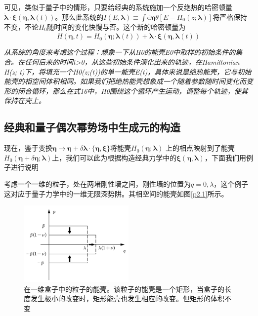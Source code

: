 可见，类似于量子中的情形，只要给经典的系统施加一个反绝热的哈密顿量$\dot{\boldsymbol{\lambda}} \cdot \boldsymbol{\xi}(\bm{\eta}, \boldsymbol{\lambda}(t))$。那么此系统的$I(E, \boldsymbol{\lambda}) \equiv \int \mathrm{d} \bm{\eta} \theta\left[E-H_{0}(z ; \boldsymbol{\lambda})\right]$将严格保持不变，不论$H_0 $随时间的变化快慢与否。这个新的哈密顿量为
\begin{equation}
    H(\bm{\eta}, t)=H_{0}(\bm{\eta} ; \boldsymbol{\lambda}(t))+\dot{\boldsymbol{\lambda}} \cdot \boldsymbol{\xi}(\bm{\eta}, \boldsymbol{\lambda}(t))
    \label{eq2.17}
\end{equation}

\emph{从系综的角度来考虑这个过程：想象一下从H0的能壳E0中取样的初始条件的集合。在任何后来的时间t>0，从这些初始条件演化出来的轨迹，在Hamiltonian H(z; t)下，将填充一个H0(z;(t))的单一能壳E(t)，具体来说是绝热能壳，它与初始能壳的相空间体积相同。如果我们把绝热能壳想象成一个随着参数随时间变化而变形的闭合循环，那么在式16中，H0围绕这个循环产生运动，调整每个轨迹，使其保持在壳上。}

\subsection{经典和量子偶次幂势场中生成元的构造}

\qquad 现在，鉴于变换$\bm{\eta} \to \bm{\eta} + \delta  \bm{\lambda} \cdot \{\bm{\eta}, \boldsymbol{\xi}\}$将能壳$H_{0}(\bm{\eta} ; \boldsymbol{\lambda})$ 上的相点映射到了能壳 $ H_{0}(\bm{\eta} + \delta \bm{\eta} ; \boldsymbol{\lambda})$上，我们可以此为根据构造经典力学中的$\boldsymbol{\xi}(\bm{\eta}, \boldsymbol{\lambda})$，下面我们用例子进行说明

考虑一个一维的粒子，处在两堵刚性墙之间，刚性墙的位置为$q=0,\lambda$，这个例子这对应于量子力学中的一维无限深势阱。其相空间的能壳如图\eqref{p2.1}所示。
\begin{figure}[!htbp]
    \begin{center}
        \includegraphics[width=0.5\textwidth]{figures/p2.1.pdf}
    \end{center}
    \caption{在一维盒子中的粒子的能壳。该粒子的能壳是一个矩形，当盒子的长度发生极小的改变时，矩形能壳也发生相应的改变。但矩形的体积不变}
    \label{p2.1}
\end{figure}

